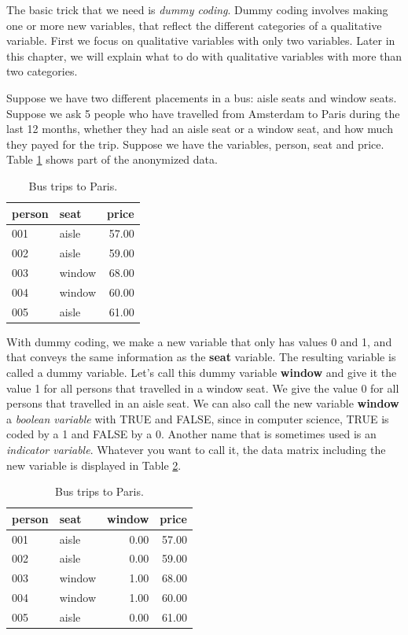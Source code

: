 \documentclass[]{report}\usepackage[]{graphicx}\usepackage[]{color}
\begin{document}
The basic trick that we need is \textit{dummy coding}. Dummy coding involves making one or more new variables, that reflect the different categories of a qualitative variable. First we focus on qualitative variables with only two variables. Later in this chapter, we will explain what to do with qualitative variables with more than two categories. 

Suppose we have two different placements in a bus: aisle seats and window seats. Suppose we ask 5 people who have travelled from Amsterdam to Paris during the last 12 months, whether they had an aisle seat or a window seat, and how much they payed for the trip. Suppose we have the variables, person, seat and price. Table \ref{tab:dummy_1} shows part of the anonymized data.

\begin{table}[ht]
\centering
\caption{Bus trips to Paris.} 
\label{tab:dummy_1}
\begin{tabular}{llr}
  \hline
person & seat & price \\ 
  \hline
001 & aisle & 57.00 \\ 
  002 & aisle & 59.00 \\ 
  003 & window & 68.00 \\ 
  004 & window & 60.00 \\ 
  005 & aisle & 61.00 \\ 
   \hline
\end{tabular}
\end{table}



With dummy coding, we make a new variable that only has values 0 and 1, and that conveys the same information as the \textbf{seat} variable. The resulting variable is called a dummy variable. Let's call this dummy variable \textbf{window} and give it the value 1 for all persons that travelled in a window seat. We give the value 0 for all persons that travelled in an aisle seat. We can also call the new variable \textbf{window} a \textit{boolean variable} with TRUE and FALSE, since in computer science, TRUE is coded by a 1 and FALSE by a 0. Another name that is sometimes used is an \textit{indicator variable}. Whatever you want to call it, the data matrix including the new variable is displayed in Table \ref{tab:dummy_2}.

\begin{table}[ht]
\centering
\caption{Bus trips to Paris.} 
\label{tab:dummy_2}
\begin{tabular}{llrr}
  \hline
person & seat & window & price \\ 
  \hline
001 & aisle & 0.00 & 57.00 \\ 
  002 & aisle & 0.00 & 59.00 \\ 
  003 & window & 1.00 & 68.00 \\ 
  004 & window & 1.00 & 60.00 \\ 
  005 & aisle & 0.00 & 61.00 \\ 
   \hline
\end{tabular}
\end{table}
\end{document}
